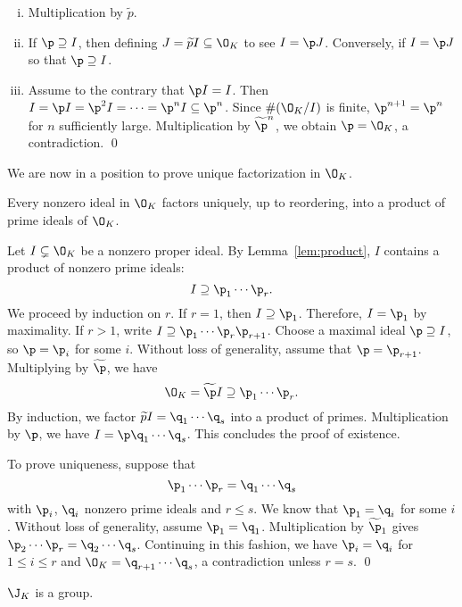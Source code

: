 \pf
\begin{enumerate}[(i)]
\item Multiplication by $\widetilde{p}$.
\item If $\p \supseteq I$, then defining $J= \widetilde{p} I \subseteq \O_K$ to see $I=\p J$. Conversely, if $I=\p J$ so that $\p \supseteq I$. 
\item Assume to the contrary that $\p I=I$. Then $I=\p I=\p^2 I=\cdots= \p^n I \subseteq \p^n$. Since $\#(\O_K/I)$ is finite, $\p^{n+1}=\p^n$ for $n$ sufficiently large. Multiplication by $\widetilde{\p}^n$, we obtain $\p=\O_K$, a contradiction. \qed \\
\end{enumerate}

We are now in a position to prove unique factorization in $\O_K$.

\begin{thm}\label{thm:uniquefact}
Every nonzero ideal in $\O_K$ factors uniquely, up to reordering, into a product of prime ideals of $\O_K$.
\end{thm}

\pf Let $I \subsetneq \O_K$ be a nonzero proper ideal. By Lemma~\ref{lem:product}, $I$ contains a product of nonzero prime ideals:
	\[
	I \supseteq \p_1 \cdots \p_r.
	\]
We proceed by induction on $r$. If $r=1$, then $I \supseteq \p_1$. Therefore, $I=\p_1$ by maximality. If $r>1$, write $I \supseteq \p_1 \cdots \p_r\p_{r+1}$. Choose a maximal ideal $\p \supseteq I$, so $\p=\p_i$ for some $i$. Without loss of generality, assume that $\p=\p_{r+1}$. Multiplying by $\widetilde{\p}$, we have
	\[
	\O_K= \widetilde{\p} I \supseteq \p_1 \cdots \p_r.
	\]
By induction, we factor $\widetilde{p} I= \q_1 \cdots \q_s$ into a product of primes. Multiplication by $\p$, we have $I=\p \q_1\cdots\q_s$. This concludes the proof of existence.

To prove uniqueness, suppose that
	\[
	\p_1\cdots \p_r = \q_1 \cdots \q_s
	\]
with $\p_i$, $\q_i$ nonzero prime ideals and $r \leq s$. We know that $\p_1=\q_i$ for some $i$. Without loss of generality, assume $\p_1=\q_1$. Multiplication by $\widetilde{\p}_1$ gives $\p_2 \cdots \p_r= \q_2 \cdots \q_s$. Continuing in this fashion, we have $\p_i=\q_i$ for $1 \leq i \leq r$ and $\O_K=\q_{r+1}\cdots\q_s$, a contradiction unless $r=s$. \qed \\

\begin{cor}
$\J_K$ is a group.
\end{cor}

